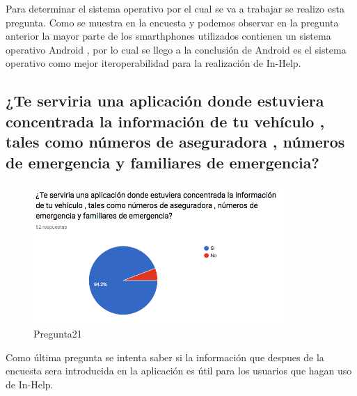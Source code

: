 Para determinar el sistema operativo por el cual se va a trabajar se realizo esta pregunta. Como se muestra en la encuesta y podemos observar en la pregunta anterior la mayor parte de los smarthphones utilizados contienen un sistema operativo Android , por lo cual se llego a la conclusión de Android es el sistema operativo como mejor iteroperabilidad para la realización de In-Help.\\

\subsection{¿Te serviria una aplicación donde estuviera concentrada la información de tu vehículo , tales como números de aseguradora , números de emergencia y familiares de emergencia?}

\begin{figure}[htbp!]
	\begin{center}
		\includegraphics[width=0.85\textwidth]{DisenoEstructura/imagenes/Pregunta21}
		\caption{Pregunta21}
		\label{DE/FO/Pregunta21}
	\end{center}
\end{figure}

Como última pregunta se intenta saber si la información que despues de la encuesta sera introducida en la aplicación es útil para los usuarios que hagan uso de In-Help.\\





